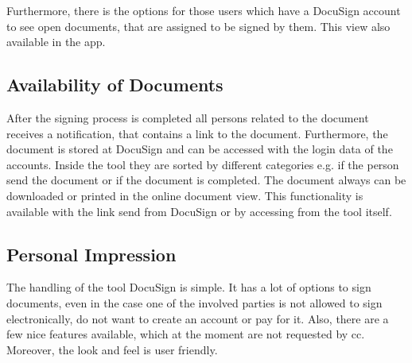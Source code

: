 Furthermore, there is the options for those users which have a DocuSign account to see open documents, that are assigned to be signed by them. This view also available in the \gls{app}.

\subsection{Availability of Documents}
After the signing process is completed all persons related to the document receives a notification, that contains a link to the document. Furthermore, the document is stored at DocuSign and can be accessed with the login data of the accounts. Inside the tool they are sorted by different categories e.g. if the person send the document or if the document is completed. The document always can be downloaded or printed in the online document view. This functionality is available with the link send from DocuSign or by accessing from the tool itself.

\subsection{Personal Impression}
The handling of the tool DocuSign is simple. It has a lot of options to sign documents, even in the case one of the involved parties is not allowed to sign electronically, do not want to create an account or pay for it. Also, there are a few nice features available, which at the moment are not requested by \gls{cc}. Moreover, the look and feel is user friendly.